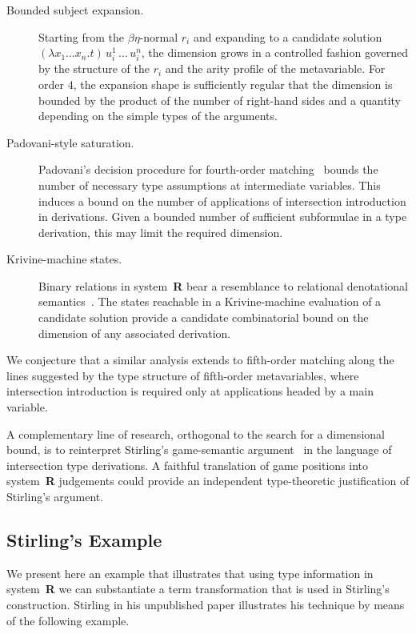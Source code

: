 \documentclass{easychair}
\theoremstyle{plain}%
\renewcommand{\:}{\mbox{:}\xspace}
\begin{document}
\begin{description}
\item[Bounded subject expansion.] Starting from the $\beta\eta$-normal $r_i$ and expanding to a candidate solution $(\lambda x_1\ldots x_n.t)\,u_i^1\,\ldots\,u_i^n$, the dimension grows in a controlled fashion governed by the structure of the $r_i$ and the arity profile of the metavariable.
For order $4$, the expansion shape is sufficiently regular that the dimension is bounded by the product of the number of right-hand sides and a quantity depending on the simple types of the arguments.
\item[Padovani-style saturation.] Padovani's decision procedure for fourth-order matching~\cite{padovani2000} bounds the number of necessary type assumptions at intermediate variables.
This induces a bound on the number of applications of intersection introduction in derivations.
Given a bounded number of sufficient subformulae in a type derivation, this may limit the required dimension. 
\item[Krivine-machine states.] Binary relations in system~\textbf{R} bear a resemblance to relational denotational semantics~\cite{Carvalho18}.
The states reachable in a Krivine-machine evaluation of a candidate solution provide a candidate combinatorial bound on the dimension of any associated derivation.
\end{description}

We conjecture that a similar analysis extends to fifth-order matching along the lines suggested by the type structure of fifth-order metavariables, where intersection introduction is required only at applications headed by a main variable.

A complementary line of research, orthogonal to the search for a dimensional bound, is to reinterpret Stirling's game-semantic argument~\cite{stirling2009} in the language of intersection type derivations.
A faithful translation of game positions into system~\textbf{R} judgements could provide an independent type-theoretic justification of Stirling's argument.

\subsection{Stirling's Example}

We present here an example that illustrates that using type information in system~\textbf{R} we can substantiate a term transformation that is used in Stirling's construction.
Stirling in his unpublished paper \cite{Stirling13} illustrates his technique by means of the following example.
\end{document}
